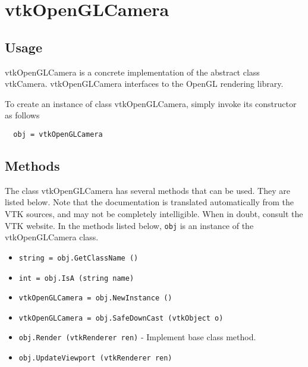 \section{vtkOpenGLCamera}

\subsection{Usage}

 vtkOpenGLCamera is a concrete implementation of the abstract class
 vtkCamera.  vtkOpenGLCamera interfaces to the OpenGL rendering library.

To create an instance of class vtkOpenGLCamera, simply
invoke its constructor as follows
\begin{verbatim}
  obj = vtkOpenGLCamera
\end{verbatim}
\subsection{Methods}

The class vtkOpenGLCamera has several methods that can be used.
  They are listed below.
Note that the documentation is translated automatically from the VTK sources,
and may not be completely intelligible.  When in doubt, consult the VTK website.
In the methods listed below, \verb|obj| is an instance of the vtkOpenGLCamera class.
\begin{itemize}
\item  \verb|string = obj.GetClassName ()|

\item  \verb|int = obj.IsA (string name)|

\item  \verb|vtkOpenGLCamera = obj.NewInstance ()|

\item  \verb|vtkOpenGLCamera = obj.SafeDownCast (vtkObject o)|

\item  \verb|obj.Render (vtkRenderer ren)| -  Implement base class method.

\item  \verb|obj.UpdateViewport (vtkRenderer ren)|

\end{itemize}
